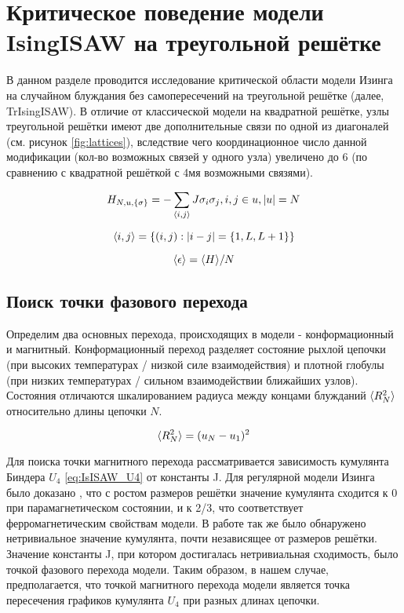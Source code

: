 \section{Критическое поведение модели IsingISAW на треугольной решётке}

В данном разделе проводится исследование критической области модели Изинга на случайном блуждания без самопересечений на треугольной решётке (далее, TrIsingISAW).
В отличие от классической модели на квадратной решётке, узлы треугольной решётки имеют две дополнительные связи по одной из диагоналей (см. рисунок \ref{fig:lattices}), 
вследствие чего координационное число данной модификации (кол-во возможных связей у одного узла) увеличено до 6 (по сравнению с квадратной решёткой с 4мя возможными связями).

\begin{equation}
\label{eq:IsISAW_H}
 H_{N,u,\{\sigma\}} = -\sum_{\langle i,j \rangle} J\sigma_i \sigma_j, i,j \in u, |u| = N
\end{equation}

\begin{equation}
	\langle i,j \rangle = \{(i,j): |i-j| = \{1, L, L+1\} \}
\end{equation}

\begin{equation}
\label{eq:TrIsISAW_E}
\langle \epsilon \rangle = \langle H \rangle / N
\end{equation}

\subsection{Поиск точки фазового перехода}

Определим два основных перехода, происходящих в модели - конформационный и магнитный.
Конформационный переход разделяет состояние рыхлой цепочки (при высоких температурах / низкой силе взаимодействия) и плотной глобулы (при низких температурах / сильном взаимодействии ближайших узлов).
Состояния отличаются шкалированием радиуса между концами блужданий $\langle R^2_N \rangle$ относительно длины цепочки $N$.

\begin{equation}
	\langle R^2_N \rangle = (u_{N} - u_{1})^2
\end{equation}

Для поиска точки магнитного перехода рассматривается зависимость кумулянта Биндера $U_4$ \eqref{eq:IsISAW_U4} от константы J.
Для регулярной модели Изинга было доказано \cite{Binder1981_Ising}, 
что с ростом размеров решётки значение кумулянта сходится к 0 при парамагнетическом состоянии, 
и к 2/3, что соответствует ферромагнетическим свойствам модели.
В работе \cite{Binder1981_Ising} так же было обнаружено нетривиальное значение кумулянта, почти независящее от размеров решётки.
Значение константы J, при котором достигалась нетривиальная сходимость, было точкой фазового перехода модели.
Таким образом, в нашем случае, предполагается, что точкой магнитного перехода модели является 
точка пересечения графиков кумулянта $U_4$ при разных длинах цепочки.

